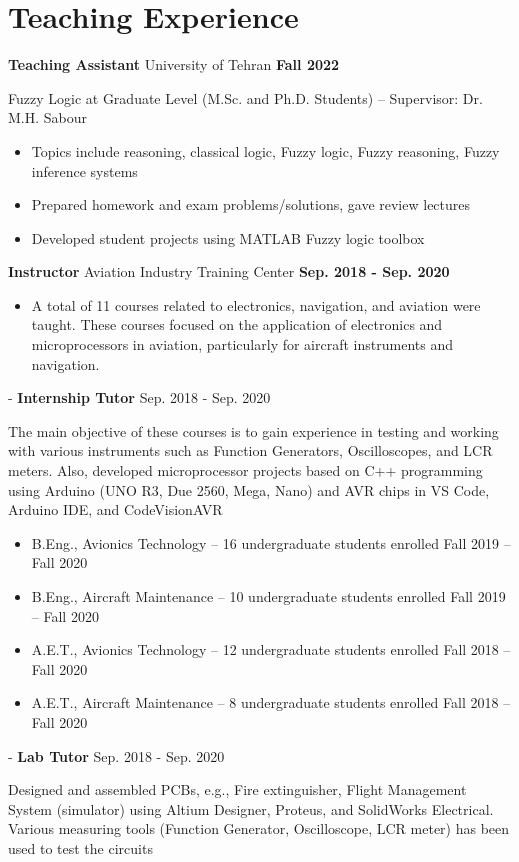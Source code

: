 \documentclass[a4,25pt]{article}
\newenvironment{Experience}[1]{
    \section*{#1} \vspace{-.2cm}
    \hspace{.5cm}
    \begin{minipage}{0.95\linewidth}
    }{ \end{minipage}}
\newcommand{\experience}[3]{ 
  \vspace{0.1cm}\textbf{#1}{ #2} \hfill \textbf{#3} \par
}
\newcommand{\expdetail}[1]{
        {#1 } \par
}
\newcommand{\expdetails}[1]{
    \begin{itemize} 
    \item #1 \vspace{1pt}
    \end{itemize} 
}
\begin{document}
\begin{Experience}{Teaching Experience}
    \experience{Teaching Assistant}{University of Tehran}{Fall 2022}
    \expdetail{Fuzzy Logic at Graduate Level (M.Sc. and Ph.D. Students) – Supervisor: Dr. M.H. Sabour}
    \expdetails{Topics include reasoning, classical logic, Fuzzy logic, Fuzzy reasoning, Fuzzy inference systems}
    \expdetails{Prepared homework and exam problems/solutions, gave review lectures}
    \expdetails{Developed student projects using MATLAB Fuzzy logic toolbox}
    \experience{Instructor}{Aviation Industry Training Center}{Sep. 2018 - Sep. 2020}
    \expdetails{A total of 11 courses related to electronics, navigation, and aviation were taught. These courses focused on the application of electronics and microprocessors in aviation, particularly for aircraft instruments and navigation.}
    \hspace{0.02\linewidth}\begin{minipage}{0.98\linewidth}
    {
    \expdetail{\hspace{-0.1cm} - \hspace{0.1cm} \textbf{Internship Tutor} \hfill Sep. 2018 - Sep. 2020}
    \hspace{0.02\linewidth}\begin{minipage}{0.98\linewidth}
    {
    \expdetail{The main objective of these courses is to gain experience in testing and working with various instruments such as Function Generators, Oscilloscopes, and LCR meters. Also, developed microprocessor projects based on C++ programming using Arduino (UNO R3, Due 2560, Mega, Nano) and AVR chips in VS Code, Arduino IDE, and CodeVisionAVR}
    \expdetails{B.Eng., Avionics Technology – 16 undergraduate students enrolled \hfill Fall 2019 – Fall 2020}
    \expdetails{B.Eng., Aircraft Maintenance – 10 undergraduate students enrolled \hfill Fall 2019 – Fall 2020}
    \expdetails{A.E.T., Avionics Technology – 12 undergraduate students enrolled \hfill Fall 2018 – Fall 2020} 
    \expdetails{A.E.T., Aircraft Maintenance – 8 undergraduate students enrolled \hfill Fall 2018 – Fall 2020}
    }\end{minipage}
    \expdetail{\hspace{-0.1cm} - \hspace{0.1cm}\textbf{Lab Tutor} \hfill Sep. 2018 - Sep. 2020}
    \hspace{0.02\linewidth}\begin{minipage}{0.98\linewidth}
    {
    \expdetail{Designed and assembled PCBs, e.g., Fire extinguisher, Flight Management System (simulator) using Altium Designer, Proteus, and SolidWorks Electrical. Various measuring tools (Function Generator, Oscilloscope, LCR meter) has been used to test the circuits}
}
\end{minipage}}
\end{minipage}
\end{Experience}
\end{document}
